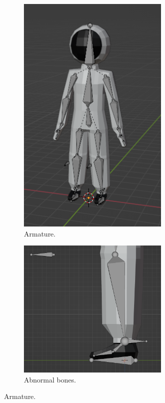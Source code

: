 \begin{figure}[h]
    \centering
    \begin{subfigure}{0.45\textwidth}
        \centering
        \includegraphics[width=0.8\textwidth]{chapters/theoretical_foundations/sections/models/resources/Armature.png}
        \caption{Armature.}
        \label{fig:armature}
    \end{subfigure}
    \hfill
    \begin{subfigure}{0.45\textwidth}
        \centering
        \includegraphics[width=0.8\textwidth]{chapters/theoretical_foundations/sections/models/resources/ArmatureFoot.png}
        \caption{Abnormal bones.}
        \label{fig:armature_foot}
    \end{subfigure}

    \caption{Armature.}
\end{figure}

